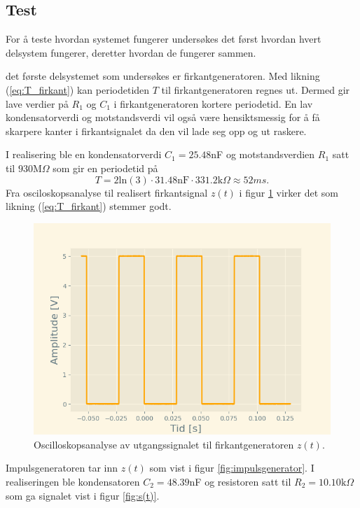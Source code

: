 \documentclass[a4paper,11pt,norsk]{article}
\begin{document}
\subsection{Test}
\label{test}

For å teste hvordan systemet fungerer undersøkes det først hvordan hvert delsystem fungerer, deretter hvordan de fungerer sammen. 

det første delsystemet som undersøkes er firkantgeneratoren. Med likning (\ref{eq:T_firkant}) kan periodetiden $T$ til firkantgeneratoren regnes ut. Dermed gir lave verdier på $R_1$ og $C_1$ i firkantgeneratoren kortere periodetid. En lav kondensatorverdi og motstandsverdi vil også være hensiktsmessig for å få skarpere kanter i firkantsignalet da den vil lade seg opp og ut raskere. 

I realisering ble en kondensatorverdi $C_1 = 25.48$nF og motstandsverdien $R_1$ satt til $930$M$\Omega$ som gir en periodetid på
\begin{equation}
    T = 2\text{ln}(3)\cdot31.48\text{nF}\cdot331.2\text{k}\Omega \approx 52ms.
\end{equation}
Fra osciloskopsanalyse til realisert firkantsignal $z(t)$ i figur \ref{fig:firkantsignal} virker det som likning (\ref{eq:T_firkant}) stemmer godt. 
\begin{figure}[H]
  \centering 
  \includegraphics[scale=0.65]{D1/firkantsignal.png}
  \caption{Oscilloskopsanalyse av utgangssignalet til firkantgeneratoren $z(t)$.}
  \label{fig:firkantsignal}
\end{figure}
Impulsgeneratoren tar inn $z(t)$ som vist i figur \ref{fig:impulsgenerator}. I realiseringen ble kondensatoren $C_2 = 48.39$nF og resistoren satt til $R_2 = 10.10\text{k}\Omega$ som ga signalet vist i figur \ref{fig:s(t)}.
\end{document}
